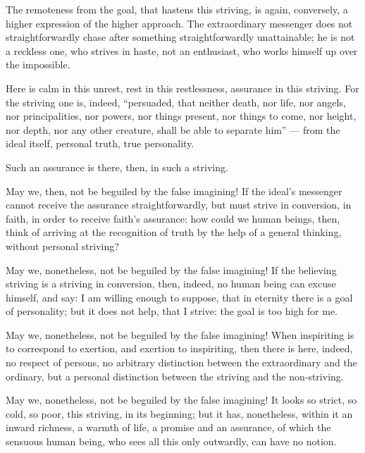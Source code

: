 \documentclass[12pt,a4paper]{book}
\begin{document}
The remoteness from the goal, that hastens this striving, is again, conversely, a higher expression of the higher approach. The extraordinary messenger does not straightforwardly chase after something straightforwardly unattainable; he is not a reckless one, who strives in haste, not an enthusiast, who works himself up over the impossible.

Here is calm in this unrest, rest in this restlessness, assurance in this striving. For the striving one is, indeed, ``persuaded, that neither death, nor life, nor angels, nor principalities, nor powers, nor things present, nor things to come, nor height, nor depth, nor any other creature, shall be able to separate him'' --- from the ideal itself, personal truth, true personality.

Such an assurance is there, then, in such a striving.

May we, then, not be beguiled by the false imagining! If the ideal's messenger cannot receive the assurance straightforwardly, but must strive in conversion, in faith, in order to receive faith's assurance: how could we human beings, then, think of arriving at the recognition of truth by the help of a general thinking, without personal striving?

May we, nonetheless, not be beguiled by the false imagining! If the believing striving is a striving in conversion, then, indeed, no human being can excuse himself, and say: I am willing enough to suppose, that in eternity there is a goal of personality; but it does not help, that I strive: the goal is too high for me.

May we, nonetheless, not be beguiled by the false imagining! When inspiriting is to correspond to exertion, and exertion to inspiriting, then there is here, indeed, no respect of persons, no arbitrary distinction between the extraordinary and the ordinary, but a personal distinction between the striving and the non-striving.

May we, nonetheless, not be beguiled by the false imagining! It looks so strict, so cold, so poor, this striving,
in its beginning; but it has, nonetheless, within it an inward richness, a warmth of life, a promise and an assurance, of which the sensuous human being, who sees all this only outwardly, can have no notion.
\end{document}

